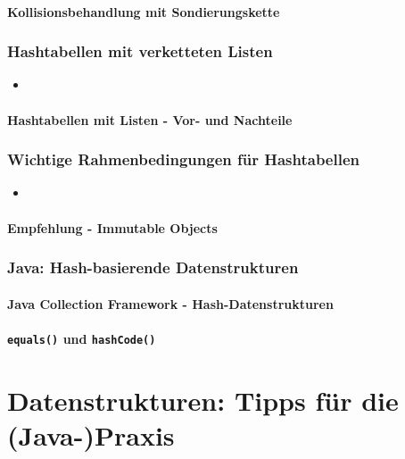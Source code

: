 \subsection{Kollisionsbehandlung mit Sondierungskette}

\section{Hashtabellen mit verketteten Listen}
\begin{itemize}[noitemsep,topsep=0pt,leftmargin=*]
    \item
\end{itemize}
\subsection{Hashtabellen mit Listen - Vor- und Nachteile}

\section{Wichtige Rahmenbedingungen für Hashtabellen}
\begin{itemize}[noitemsep,topsep=0pt,leftmargin=*]
    \item
\end{itemize}
\subsection{Empfehlung - Immutable Objects}

\section{Java: Hash-basierende Datenstrukturen}
\subsection{Java Collection Framework - Hash-Datenstrukturen}
\subsection{\texttt{equals()} und \texttt{hashCode()}}

\part{Datenstrukturen: Tipps für die (Java-)Praxis}
